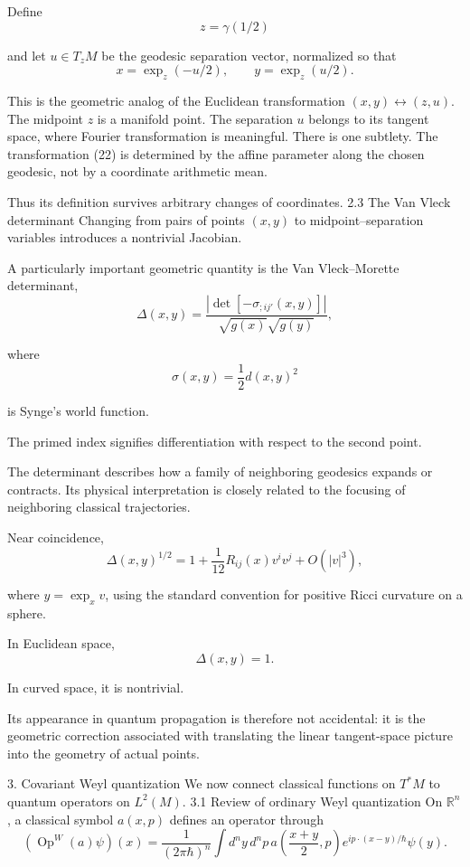 Define
\[
z=\gamma(1/2)
\tag{21}
\]

and let \(u\in T_zM\) be the geodesic separation vector, normalized so that
\[
x=\exp_z(-u/2),\qquad
y=\exp_z(u/2).
\tag{22}
\]

This is the geometric analog of the Euclidean transformation \((x,y)\leftrightarrow(z,u)\).
The midpoint \(z\) is a manifold point. The separation \(u\) belongs to its tangent space, where Fourier transformation is meaningful.
There is one subtlety. The transformation (22) is determined by the affine parameter along the chosen geodesic, not by a coordinate arithmetic mean.

Thus its definition survives arbitrary changes of coordinates.
2.3 The Van Vleck determinant
Changing from pairs of points \((x,y)\) to midpoint–separation variables introduces a nontrivial Jacobian.

A particularly important geometric quantity is the Van Vleck–Morette determinant,
\[
\boxed{
\Delta(x,y)=
\frac{
\left|\det[-\sigma_{;ij'}(x,y)]\right|
}{
\sqrt{g(x)}\sqrt{g(y)}
},
}
\tag{23}
\]

where
\[
\sigma(x,y)=\frac12d(x,y)^2
\tag{24}
\]

is Synge's world function.

The primed index signifies differentiation with respect to the second point.

The determinant describes how a family of neighboring geodesics expands or contracts. Its physical interpretation is closely related to the focusing of neighboring classical trajectories.

Near coincidence,
\[
\Delta(x,y)^{1/2}
=
1+\frac1{12}R_{ij}(x)v^iv^j
+O(|v|^3),
\tag{25}
\]

where \(y=\exp_xv\), using the standard convention for positive Ricci curvature on a sphere.

In Euclidean space,
\[
\Delta(x,y)=1.
\]

In curved space, it is nontrivial.

Its appearance in quantum propagation is therefore not accidental: it is the geometric correction associated with translating the linear tangent-space picture into the geometry of actual points.

3. Covariant Weyl quantization
We now connect classical functions on \(T^*M\) to quantum operators on \(L^2(M)\).
3.1 Review of ordinary Weyl quantization
On \(\mathbb R^n\), a classical symbol \(a(x,p)\) defines an operator through
\[
(\operatorname{Op}^{W}(a)\psi)(x)
=
\frac1{(2\pi\hbar)^n}
\int d^ny\,d^np\,
a\left(\frac{x+y}{2},p\right)
e^{ip\cdot(x-y)/\hbar}\psi(y).
\tag{26}
\]


